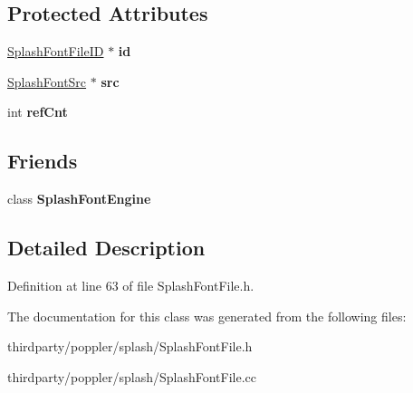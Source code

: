 \subsection*{Protected Attributes}
\begin{DoxyCompactItemize}
\item 
\mbox{\label{class_splash_font_file_aae1c3c827262aec8274e1d180f707388}} 
\hyperlink{class_splash_font_file_i_d}{Splash\+Font\+File\+ID} $\ast$ {\bfseries id}
\item 
\mbox{\label{class_splash_font_file_a0cadffc83c531435d6e21419a9b8749c}} 
\hyperlink{class_splash_font_src}{Splash\+Font\+Src} $\ast$ {\bfseries src}
\item 
\mbox{\label{class_splash_font_file_a9f40e9a0844875798428dc0840247f85}} 
int {\bfseries ref\+Cnt}
\end{DoxyCompactItemize}
\subsection*{Friends}
\begin{DoxyCompactItemize}
\item 
\mbox{\label{class_splash_font_file_a327464a26417a8eea69c5417cbbe8ba7}} 
class {\bfseries Splash\+Font\+Engine}
\end{DoxyCompactItemize}


\subsection{Detailed Description}


Definition at line 63 of file Splash\+Font\+File.\+h.



The documentation for this class was generated from the following files\+:\begin{DoxyCompactItemize}
\item 
thirdparty/poppler/splash/Splash\+Font\+File.\+h\item 
thirdparty/poppler/splash/Splash\+Font\+File.\+cc\end{DoxyCompactItemize}
